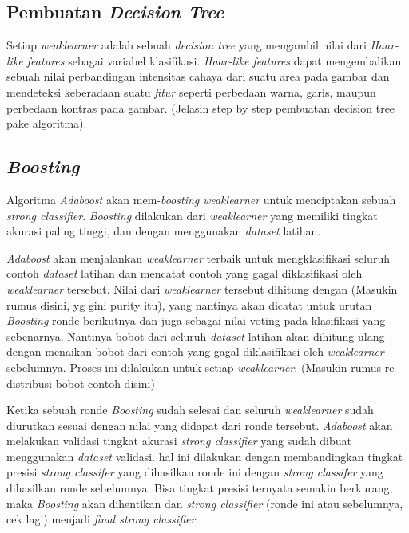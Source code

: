 \subsection{Pembuatan \textit{Decision Tree}}

Setiap \emph{weaklearner} adalah sebuah \emph{decision tree} yang mengambil nilai 
dari \emph{Haar-like features} sebagai variabel klasifikasi.
\emph{Haar-like features} dapat mengembalikan 
sebuah nilai perbandingan intensitas cahaya dari suatu area pada gambar dan 
mendeteksi keberadaan suatu \emph{fitur} seperti 
perbedaan warna, garis, maupun perbedaan kontras pada gambar. 
(Jelasin step by step pembuatan decision tree pake algoritma).

\subsection{\emph{Boosting}}

Algoritma \emph{Adaboost} akan mem-\emph{boosting} \emph{weaklearner} untuk 
menciptakan sebuah \emph{strong classifier}. \emph{Boosting} dilakukan dari 
\emph{weaklearner} yang memiliki tingkat akurasi paling tinggi, dan dengan 
menggunakan \emph{dataset} latihan.

\emph{Adaboost} akan menjalankan \emph{weaklearner} terbaik untuk 
mengklasifikasi seluruh contoh \emph{dataset} latihan dan mencatat contoh yang 
gagal diklasifikasi oleh \emph{weaklearner} tersebut. Nilai dari \emph{weaklearner} 
tersebut dihitung dengan (Masukin rumus disini, yg gini purity itu), yang nantinya 
akan dicatat untuk urutan \emph{Boosting} ronde berikutnya dan juga sebagai nilai 
voting pada klasifikasi yang sebenarnya. 
Nantinya bobot dari seluruh \emph{dataset} latihan akan dihitung ulang dengan menaikan bobot dari contoh 
yang gagal diklasifikasi oleh \emph{weaklearner} sebelumnya. Proses ini dilakukan 
untuk setiap \emph{weaklearner}. (Masukin rumus re-distribusi bobot contoh disini)

Ketika sebuah ronde \emph{Boosting} sudah selesai dan seluruh \emph{weaklearner} sudah  diurutkan sesuai dengan 
nilai yang didapat dari ronde tersebut. \emph{Adaboost} akan melakukan validasi 
tingkat akurasi \emph{strong classifier} yang sudah dibuat menggunakan \emph{dataset} validasi. 
hal ini dilakukan dengan membandingkan tingkat presisi \emph{strong classifer} 
yang dihasilkan ronde ini dengan \emph{strong classifer} yang dihasilkan ronde 
sebelumnya. Bisa tingkat presisi ternyata semakin berkurang, maka \emph{Boosting} 
akan dihentikan dan \emph{strong classifier} (ronde ini atau sebelumnya, cek lagi) 
menjadi \emph{final strong classifier}.

